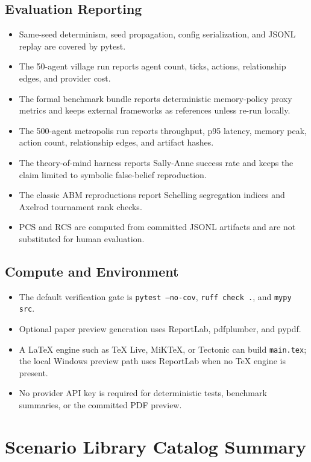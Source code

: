 \subsection{Evaluation Reporting}

\begin{itemize}
  \item Same-seed determinism, seed propagation, config serialization, and JSONL replay are covered by pytest.
  \item The 50-agent village run reports agent count, ticks, actions, relationship edges, and provider cost.
  \item The formal benchmark bundle reports deterministic memory-policy proxy metrics and keeps external frameworks as references unless re-run locally.
  \item The 500-agent metropolis run reports throughput, p95 latency, memory peak, action count, relationship edges, and artifact hashes.
  \item The theory-of-mind harness reports Sally-Anne success rate and keeps the claim limited to symbolic false-belief reproduction.
  \item The classic ABM reproductions report Schelling segregation indices and Axelrod tournament rank checks.
  \item PCS and RCS are computed from committed JSONL artifacts and are not substituted for human evaluation.
\end{itemize}

\subsection{Compute and Environment}

\begin{itemize}
  \item The default verification gate is \texttt{pytest --no-cov}, \texttt{ruff check .}, and \texttt{mypy src}.
  \item Optional paper preview generation uses ReportLab, pdfplumber, and pypdf.
  \item A LaTeX engine such as TeX Live, MiKTeX, or Tectonic can build \texttt{main.tex}; the local Windows preview path uses ReportLab when no TeX engine is present.
  \item No provider API key is required for deterministic tests, benchmark summaries, or the committed PDF preview.
\end{itemize}

\section{Scenario Library Catalog Summary}

